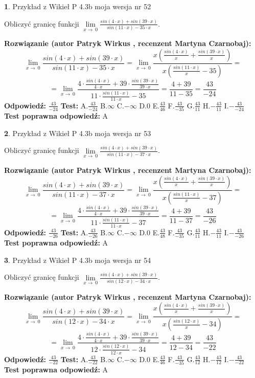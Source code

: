 \documentclass[12pt, a4paper]{article}
\theoremstyle{definition} %
\newtheorem{zad}{}
\newcommand{\zadStart}[1]{\begin{zad}#1\newline}
\newcommand{\zadStop}{\end{zad}}
\newcommand{\rozwStart}[2]{\noindent \textbf{Rozwiązanie (autor #1 , recenzent #2): }\newline}
\newcommand{\rozwStop}{\newline}
\newcommand{\odpStart}{\noindent \textbf{Odpowiedź:}\newline}
\newcommand{\odpStop}{\newline}
\newcommand{\testStart}{\noindent \textbf{Test:}\newline}
\newcommand{\testStop}{\newline}
\newcommand{\kluczStart}{\noindent \textbf{Test poprawna odpowiedź:}\newline}
\newcommand{\kluczStop}{\newline}
\begin{document}
\zadStart{Przykład z Wikieł P 4.3b moja wersja nr 52}


Obliczyć granicę funkcji $\lim\limits_{x\to\ 0}\frac{sin(4 \cdot x)+sin(39 \cdot x)}{sin(11 \cdot x)-35 \cdot x}$.
\zadStop
\rozwStart{Patryk Wirkus}{Martyna Czarnobaj}
$$\lim\limits_{x\to\ 0}\frac{sin(4 \cdot x)+sin(39 \cdot x)}{sin(11 \cdot x)-35 \cdot x}=\lim\limits_{x\to\ 0}\frac{x(\frac{sin(4 \cdot x)}{x}+\frac{sin(39 \cdot x)}{x})}{x(\frac{sin(11 \cdot x)}{x}-35)}=$$
$$=\lim\limits_{x\to\ 0}\frac{4 \cdot \frac{sin(4 \cdot x)}{4 \cdot x}+39 \cdot \frac{sin(39 \cdot x)}{39 \cdot x}}{11 \cdot \frac{sin(11 \cdot x)}{11 \cdot x}-35}=\frac{4+39}{11-35} = \frac{43}{-24}$$
\rozwStop
\odpStart
$\frac{43}{-24}$
\odpStop
\testStart
A.$\frac{43}{-24}$
B.$\infty$
C.$-\infty$
D.$0$
E.$\frac{43}{46}$
F.$\frac{43}{-35}$
G.$\frac{43}{11}$
H.$-\frac{43}{11}$
I.$-\frac{43}{-24}$
\testStop
\kluczStart
A
\kluczStop



\zadStart{Przykład z Wikieł P 4.3b moja wersja nr 53}


Obliczyć granicę funkcji $\lim\limits_{x\to\ 0}\frac{sin(4 \cdot x)+sin(39 \cdot x)}{sin(11 \cdot x)-37 \cdot x}$.
\zadStop
\rozwStart{Patryk Wirkus}{Martyna Czarnobaj}
$$\lim\limits_{x\to\ 0}\frac{sin(4 \cdot x)+sin(39 \cdot x)}{sin(11 \cdot x)-37 \cdot x}=\lim\limits_{x\to\ 0}\frac{x(\frac{sin(4 \cdot x)}{x}+\frac{sin(39 \cdot x)}{x})}{x(\frac{sin(11 \cdot x)}{x}-37)}=$$
$$=\lim\limits_{x\to\ 0}\frac{4 \cdot \frac{sin(4 \cdot x)}{4 \cdot x}+39 \cdot \frac{sin(39 \cdot x)}{39 \cdot x}}{11 \cdot \frac{sin(11 \cdot x)}{11 \cdot x}-37}=\frac{4+39}{11-37} = \frac{43}{-26}$$
\rozwStop
\odpStart
$\frac{43}{-26}$
\odpStop
\testStart
A.$\frac{43}{-26}$
B.$\infty$
C.$-\infty$
D.$0$
E.$\frac{43}{48}$
F.$\frac{43}{-35}$
G.$\frac{43}{11}$
H.$-\frac{43}{11}$
I.$-\frac{43}{-26}$
\testStop
\kluczStart
A
\kluczStop



\zadStart{Przykład z Wikieł P 4.3b moja wersja nr 54}


Obliczyć granicę funkcji $\lim\limits_{x\to\ 0}\frac{sin(4 \cdot x)+sin(39 \cdot x)}{sin(12 \cdot x)-34 \cdot x}$.
\zadStop
\rozwStart{Patryk Wirkus}{Martyna Czarnobaj}
$$\lim\limits_{x\to\ 0}\frac{sin(4 \cdot x)+sin(39 \cdot x)}{sin(12 \cdot x)-34 \cdot x}=\lim\limits_{x\to\ 0}\frac{x(\frac{sin(4 \cdot x)}{x}+\frac{sin(39 \cdot x)}{x})}{x(\frac{sin(12 \cdot x)}{x}-34)}=$$
$$=\lim\limits_{x\to\ 0}\frac{4 \cdot \frac{sin(4 \cdot x)}{4 \cdot x}+39 \cdot \frac{sin(39 \cdot x)}{39 \cdot x}}{12 \cdot \frac{sin(12 \cdot x)}{12 \cdot x}-34}=\frac{4+39}{12-34} = \frac{43}{-22}$$
\rozwStop
\odpStart
$\frac{43}{-22}$
\odpStop
\testStart
A.$\frac{43}{-22}$
B.$\infty$
C.$-\infty$
D.$0$
E.$\frac{43}{46}$
F.$\frac{43}{-35}$
G.$\frac{43}{12}$
H.$-\frac{43}{12}$
I.$-\frac{43}{-22}$
\testStop
\kluczStart
A
\kluczStop
\end{document}
